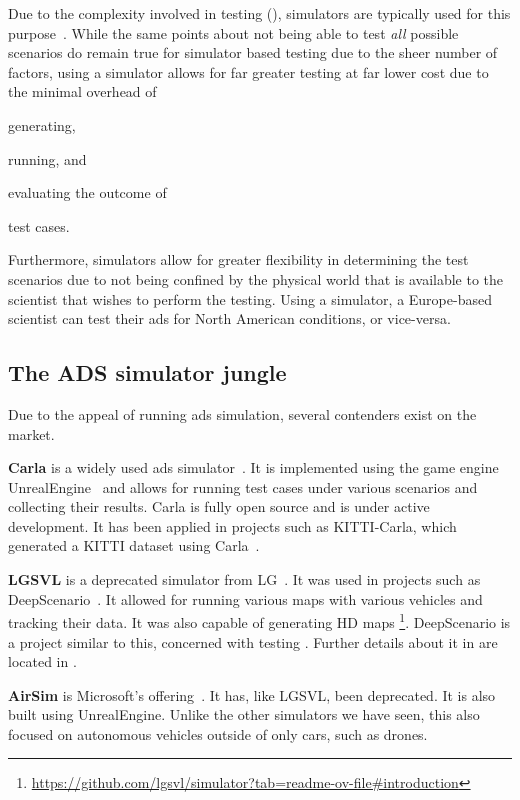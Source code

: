 Due to the complexity involved in testing  (),
simulators are typically used for this purpose~\cite{DeepScenario}. While the same points about not
being able to test \textit{all} possible scenarios do remain true for simulator based testing due to
the sheer number of factors, using a simulator allows for far greater testing at far lower cost due
to the minimal overhead of
\begin{inparaenum}
    \item generating,
    \item running, and
    \item evaluating the outcome of
\end{inparaenum}
test cases.

Furthermore, simulators allow for greater flexibility in determining the test scenarios due to not
being confined by the  physical world that is available to the scientist that wishes to perform the
testing. Using a simulator, a Europe-based scientist can test their \acrshort{ads} for North
American conditions, or vice-versa.

\subsection{The ADS simulator jungle}\label{sec:simulatorOverview}

Due to the appeal of running \acrshort{ads} simulation, several contenders exist
on the market.

\textbf{Carla} is a widely used \acrshort{ads} simulator~\cite{Carla}. It is implemented
using the game engine UnrealEngine~\cite{unrealengine} and allows for running
test cases under various scenarios and collecting their results. Carla is fully
open source and is under active development. It has been applied in projects such as KITTI-Carla,
which generated a KITTI dataset using Carla~\cite{kittiCarla}.

\textbf{LGSVL} is a deprecated simulator from LG~\cite{lgsvl}. It was used in projects such
as DeepScenario~\cite{DeepScenario}. It allowed for running various maps with various vehicles and
tracking their data. It was also capable of generating HD
maps \footnote{\url{https://github.com/lgsvl/simulator?tab=readme-ov-file\#introduction}}.
DeepScenario is a project similar to this, concerned with testing . Further details
about it in are located in .

\textbf{AirSim} is Microsoft's offering~\cite{airsim}. It has, like LGSVL,
been deprecated. It is also built using UnrealEngine. Unlike the other
simulators we have seen, this also focused on autonomous vehicles outside of
only cars, such as drones.


